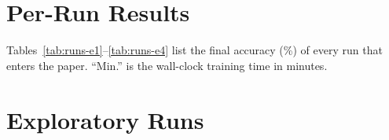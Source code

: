 \section{Per-Run Results}
\label{app:runs}

Tables~\ref{tab:runs-e1}--\ref{tab:runs-e4} list the final accuracy (\%) of every run that enters the paper.
``Min.'' is the wall-clock training time in minutes.

\begin{table}[!htbp]
\centering\footnotesize

\caption{E1, all runs.}
\label{tab:runs-e1}
\end{table}

\begin{table}[!htbp]
\centering\footnotesize

\caption{E2, all runs.}
\label{tab:runs-e2}
\end{table}

\begin{table}[!htbp]
\centering\footnotesize

\caption{E3, all runs.}
\label{tab:runs-e3}
\end{table}

\begin{table}[!htbp]
\centering\footnotesize

\caption{E4, all runs. ``perm.'' and ``maps'' are  accuracy on new textbooks that tabulate permutations and arbitrary maps.}
\label{tab:runs-e4}
\end{table}

\clearpage
\section{Exploratory Runs}
\label{app:negative}



